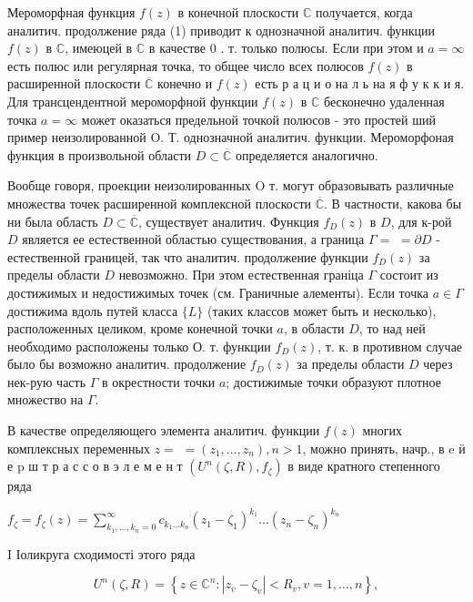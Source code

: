 \documentclass[10pt]{article}
\begin{document}
Мероморфная функция $f(z)$ в конечной плоскости $\mathbb{C}$ получается, когда аналитич. продолжение ряда (1) приводит к однозначной аналитич. функции $f(z)$ в $\mathbb{C}$, имеюцей в $\mathbb{C}$ в качестве 0 . т. только полюсы. Если при этом и $a=\infty$ есть полюс или регулярная точка, то общее число всех полюсов $f(z)$ в расширенной плоскости $\overline{\mathbb{C}}$ конечно и $f(z)$ есть р а ц и о на л ь на я ф у к к и я. Для трансцендентной мероморфной функции $f(z)$ в $\mathbb{C}$ бесконечно удаленная точка $a=\infty$ может оказаться предельной точкой полюсов - это простей ший пример неизолированной $\mathrm{O}$. Т. однозначной аналитич. функции. Мероморфоная функция в произвольной области $D \subset \overline{\mathbb{C}}$ определяется аналогично.

Вообще говоря, проекции неизолированных $\mathrm{O}$ т. могут образовывать различные множества точек расширенной комплексной плоскости $\overline{\mathbb{C}}$. В частности, какова бы ни была область $D \subset \overline{\mathbb{C}}$, существует аналитич. Функция $f_{D}(z)$ в $D$, для к-рой $D$ является ее естественной областью существования, а граница $\Gamma=$ $=\partial D$ - естественной границей, так что аналитич. продолжение функции $f_{D}(z)$ за пределы области $D$ невозможно. При этом естественная граніца $\Gamma$ состоит из достижимых и недостижимых точек (см. Граничные алементы). Если точка $a \in \Gamma$ достижима вдоль путей класса $\{L\}$ (таких классов может быть и несколько), расположенных целиком, кроме конечной точки $a$, в области $D$, то над ней необходимо расположены только О. т. функции $f_{D}(z)$, т. к. в противном случае было бы возможно аналитич. продолжение $f_{D}(z)$ за пределы области $D$ через нек-рую часть $\Gamma$ в окрестности точки $a$; достижимые точки образуют плотное множество на $\Gamma$.

В качестве определяющего элемента аналитич. функции $f(z)$ многих комплексных переменных $z=$ $=\left(z_{1}, \ldots, z_{n}\right), n>1$, можно принять, начр., в $\mathrm{e}$ ӥ е $\mathrm{p}$ ш т р а с с о в э л е м е н т $\left(U^{n}(\zeta, R), f_{\zeta}\right)$ в виде кратного степенного ряда

$f_{\zeta}=f_{\zeta}(z)=\sum_{k_{1}, \ldots, k_{n}=0}^{\infty} c_{k_{1} \ldots k_{n}}\left(z_{1}-\zeta_{1}\right)^{k_{1}} \ldots\left(z_{n}-\zeta_{n}\right)^{k_{n}}$

I Іоликруга сходимості этого ряда

\[
U^{n}(\zeta, R)=\left\{z \in \mathbb{C}^{n}:\left|z_{v}-\zeta_{v}\right|<R_{v}, v=1, \ldots, n\right\},
\]
\end{document}
